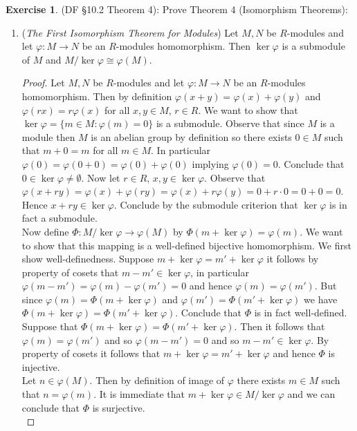 \documentclass[8pt]{amsart}
\theoremstyle{plain}%
\theoremstyle{definition}
\newtheorem{exercise}{Exercise}[section]
\theoremstyle{remark}
\numberwithin{equation}{section}
\begin{document}
\begin{exercise}
(DF \S10.2 Theorem 4): Prove Theorem 4 (Isomorphism Theorems):
	\begin{enumerate}
		\item (\textit{The First Isomorphism Theorem for Modules}) Let $M, N$ be $R$-modules and let $\varphi : M \to N$ be an $R$-modules homomorphism. Then $\ker \varphi$ is a submodule of $M$ and $M/\ker \varphi \cong \varphi(M)$.
			\begin{proof}
				Let $M, N$ be $R$-modules and let $\varphi : M \to N$ be an $R$-modules homomorphism. Then by definition $\varphi(x + y) = \varphi(x) + \varphi(y)$ and $\varphi(rx) = r\varphi(x)$ for all $x, y \in M$, $r \in R$. We want to show that $\ker \varphi = \{m \in M : \varphi(m) = 0\}$ is a submodule. Observe that since $M$ is a module then $M$ is an abelian group by definition so there exists $0 \in M$ such that $m + 0 = m$ for all $m \in M$. In particular $\varphi(0) = \varphi(0 + 0) = \varphi(0) + \varphi(0)$ implying $\varphi(0) = 0$. Conclude that $0 \in \ker \varphi \neq \emptyset$. Now let $r \in R$, $x, y \in \ker \varphi$. Observe that $\varphi(x + ry) = \varphi(x) + \varphi(ry) = \varphi(x) + r\varphi(y) = 0 + r \cdot 0 = 0 + 0 = 0$. Hence $x + ry \in \ker \varphi$. Conclude by the submodule criterion that $\ker \varphi$ is in fact a submodule.\\

				Now define $\Phi : M/\ker \varphi \to \varphi(M)$ by $\Phi(m + \ker \varphi) = \varphi(m)$. We want to show that this mapping is a well-defined bijective homomorphism. We first show well-definedness. Suppose $m + \ker \varphi = m' + \ker \varphi$ it follows by property of cosets that $m - m' \in \ker \varphi$, in particular $\varphi(m - m') = \varphi(m) - \varphi(m') = 0$ and hence $\varphi(m) = \varphi(m')$. But since $\varphi(m) = \Phi(m + \ker \varphi)$ and $\varphi(m') = \Phi(m' + \ker\varphi)$ we have $\Phi(m + \ker\varphi) = \Phi(m' + \ker\varphi)$. Conclude that $\Phi$ is in fact well-defined.\\

				Suppose that $\Phi(m + \ker\varphi) = \Phi(m' + \ker\varphi)$. Then it follows that $\varphi(m) = \varphi(m')$ and so $\varphi(m - m') = 0$ and so $m - m' \in \ker\varphi$. By property of cosets it follows that $m + \ker\varphi = m' + \ker\varphi$ and hence $\Phi$ is injective.\\

				Let $n \in \varphi(M)$. Then by definition of image of $\varphi$ there exists $m \in M$ such that $n = \varphi(m)$. It is immediate that $m + \ker\varphi \in M/\ker\varphi$ and we can conclude that $\Phi$ is surjective.\\


\end{proof}
\end{enumerate}
\end{exercise}
\end{document}
